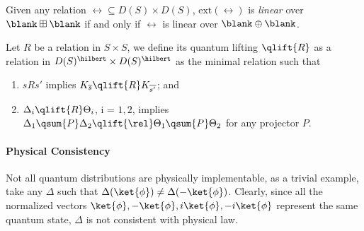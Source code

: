 \begin{proposition}
  Given any relation $\rel \subseteq D(S) \times D(S)$, $\text{ext}(\rel)$ is \emph{linear} over $\blank \boxplus \blank$ if and only if $\rel$ is linear over $\blank \oplus \blank$.
\end{proposition}

\begin{definition}
	Let $R$ be a relation in $S \times S$, we define its quantum lifting $\qlift{R}$ as a relation in $D(S)^\hilbert \times D(S)^\hilbert$ as the minimal relation such that
	\begin{enumerate}
		\item $s R s'$ implies $K_{\overline{s}} \qlift{R} K_{\overline{s'}}$; and
		\item $\Delta_i \qlift{R} \Theta_i$, i = $1, 2$, implies $\Delta_1 \qsum{P} \Delta_2 \qlift{\rel} \Theta_1 \qsum{P} \Theta_2$ for any projector $P$.
	\end{enumerate}
\end{definition}

\paragraph{Physical Consistency}

Not all quantum distributions are physically implementable, as a trivial example, take any $\Delta$ such that $\Delta(\ket{\phi}) \neq \Delta(-\ket{\phi})$.
Clearly, since all the normalized vectors $\ket{\phi}, -\ket{\phi}, i \ket{\phi}, -i \ket{\phi}$ represent the same quantum state, $\Delta$ is not consistent with physical law.

%



